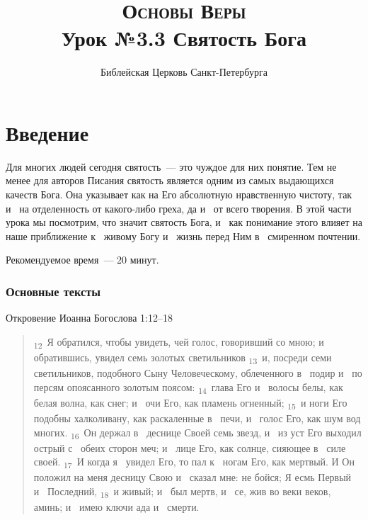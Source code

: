 \documentclass[a4paper,12pt]{article}
\title{\textsc{Основы Веры}\\Урок №3.3 Святость Бога}
\author{Библейская Церковь Санкт-Петербурга}
\date{}
\begin{document}
\maketitle

\thispagestyle{empty}

\tableofcontents



\section{Введение}

Для многих людей сегодня святость~--- это чуждое для них понятие. Тем не менее для авторов Писания святость является одним из самых выдающихся качеств Бога. Она указывает как на Его абсолютную нравственную чистоту, так и~ на отделенность от какого-либо греха, да и~ от всего творения. В этой части урока мы посмотрим, что значит святость Бога, и~ как понимание этого влияет на наше приближение к~ живому Богу и~ жизнь перед Ним в~ смиренном почтении.

Рекомендуемое время~--- 20 минут.
        
\subsubsection*{Основные тексты}

Откровение Иоанна Богослова 1:12--18

\begin{quote}
\textsubscript{12}~Я обратился, чтобы увидеть, чей голос, говоривший со мною; и~ обратившись, увидел семь золотых светильников 
\textsubscript{13}~и, посреди семи светильников, подобного Сыну Человеческому, облеченного в~ подир и~ по персям опоясанного золотым поясом: 
\textsubscript{14}~глава Его и~ волосы белы, как белая волна, как снег; и~ очи Его, как пламень огненный; 
\textsubscript{15}~и ноги Его подобны халколивану, как раскаленные в~ печи, и~ голос Его, как шум вод многих. 
\textsubscript{16}~Он держал в~ деснице Своей семь звезд, и~ из уст Его выходил острый с~ обеих сторон меч; и~ лице Его, как солнце, сияющее в~ силе своей. 
\textsubscript{17}~И когда я~ увидел Его, то пал к~ ногам Его, как мертвый. И Он положил на меня десницу Свою и~ сказал мне: не бойся; Я есмь Первый и~ Последний, 
\textsubscript{18}~и живый; и~ был мертв, и~ се, жив во веки веков, аминь; и~ имею ключи ада и~ смерти. 

\end{quote}
\end{document}
